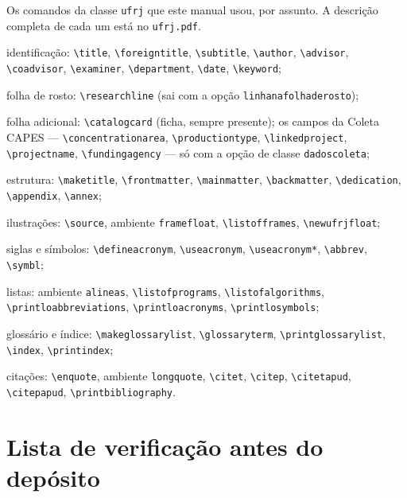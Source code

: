 \documentclass[dsc]{ufrj}
\begin{document}
  Os comandos da classe \texttt{ufrj} que este manual usou, por assunto. A descrição
  completa de cada um está no \texttt{ufrj.pdf}.

  \begin{alineas}\raggedright
    \item identificação: \verb|\title|, \verb|\foreigntitle|, \verb|\subtitle|,
      \verb|\author|, \verb|\advisor|, \verb|\coadvisor|, \verb|\examiner|,
      \verb|\department|, \verb|\date|, \verb|\keyword|;
    \item folha de rosto: \verb|\researchline| (sai com a opção
      \verb|linhanafolhaderosto|);
    \item folha adicional: \verb|\catalogcard| (ficha, sempre presente); os
      campos da Coleta CAPES --- \verb|\concentrationarea|,
      \verb|\productiontype|, \verb|\linkedproject|, \verb|\projectname|,
      \verb|\fundingagency| --- só com a opção de classe \verb|dadoscoleta|;
    \item estrutura: \verb|\maketitle|, \verb|\frontmatter|, \verb|\mainmatter|,
      \verb|\backmatter|, \verb|\dedication|, \verb|\appendix|, \verb|\annex|;
    \item ilustrações: \verb|\source|, ambiente \verb|framefloat|,
      \verb|\listofframes|, \verb|\newufrjfloat|;
    \item siglas e símbolos: \verb|\defineacronym|, \verb|\useacronym|, \verb|\useacronym*|,
      \verb|\abbrev|, \verb|\symbl|;
    \item listas: ambiente \verb|alineas|, \verb|\listofprograms|,
      \verb|\listofalgorithms|, \verb|\printloabbreviations|,
      \verb|\printloacronyms|, \verb|\printlosymbols|;
    \item glossário e índice: \verb|\makeglossarylist|, \verb|\glossaryterm|,
      \verb|\printglossarylist|, \verb|\index|, \verb|\printindex|;
    \item citações: \verb|\enquote|, ambiente \verb|longquote|, \verb|\citet|,
      \verb|\citep|, \verb|\citetapud|, \verb|\citepapud|,
      \verb|\printbibliography|.
  \end{alineas}

  \chapter{Lista de verificação antes do depósito}
\end{document}
